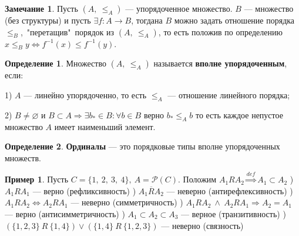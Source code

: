 \documentclass[12pt,oneside]{article}
\theoremstyle{definition}
\newtheorem{definition}{Определение}
\newtheorem{exmp}{Пример}[section]
\newtheorem{remark}{Замечание}[section]
\begin{document}
\begin{remark}
Пусть $(A,\ \leqslant_A)$ --- упорядоченное множество. $B$ --- множество (без структуры) и пусть $\exists f: A \longrightarrow B$, тогдана $B$ можно задать отношение порядка $\leqslant_B$,\ "перетащив"\ порядок из $(A,\ \leqslant_A)$, то есть положив по определению $x \leqslant_B y \Longleftrightarrow f^{-1}(x) \leqslant f^{-1}(y)$.
\end{remark} 

\begin{definition}
Множество $(A,\ \leqslant_A)$ называется \textbf{вполне упорядоченным}, если:

1) $A$ --- линейно упорядоченно, то есть $\leqslant_A$ --- отношение линейного порядка;

2) $B\neq \varnothing$ и $B\subset A \Longrightarrow \exists b_*\in B: \forall b\in B$ верно $b_* \leqslant_A b$ то есть каждое непустое множество $A$ имеет наименьший элемент.
\end{definition}

\begin{definition}
\textbf{Ординалы} --- это порядковые типы вполне упорядоченных множеств.
\end{definition}
\begin{exmp}{}
Пусть $C = \{1,\ 2,\ 3,\ 4\},\ A=\mathcal{P}(C)$. Положим $A_1 R A_2 \stackrel{def}{\Longrightarrow} A_1\subset A_2$
) $A_1 R A_1$ --- верно   (рефликсивность)
) $A_1 \overline{R} A_2$ --- неверно (антирефлексивность)
) $A_1 R A_2 \Longleftrightarrow A_2 R A_1$ --- неверно (симметричность)
) $A_1 R A_2\ \wedge\ A_2 R A_1 \Longrightarrow A_2 = A_1$ --- верно (антисимметричность)
) $A_1 \subset A_2 \subset A_3$ --- верное (транзитивность)
) $(\{1,2,3\}\ R\ \{1,4\}) \vee (\{1,4\}\ R\ \{1,2,3\})$ --- неверно (связность)
\end{exmp}
\end{document}

